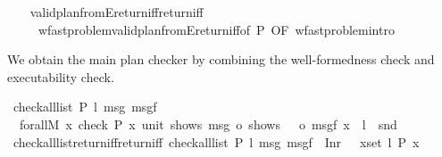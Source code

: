 \begin{isabellebody}
\endisatagproof
{\isafoldproof}%
%
\isadelimproof
\isanewline
%
\endisadelimproof
\isanewline
\ \ \isamarkupfalse%
\ valid{\isacharunderscore}{\kern0pt}plan{\isacharunderscore}{\kern0pt}from{}E{\isacharunderscore}{\kern0pt}return{\isacharunderscore}{\kern0pt}iff{\isacharprime}{\kern0pt}{\isacharbrackleft}{\kern0pt}return{\isacharunderscore}{\kern0pt}iff{\isacharbrackright}{\kern0pt}\isanewline
\ \ \ \ {\isacharequal}{\kern0pt}\ wf{\isacharunderscore}{\kern0pt}ast{\isacharunderscore}{\kern0pt}problem{\isachardot}{\kern0pt}valid{\isacharunderscore}{\kern0pt}plan{\isacharunderscore}{\kern0pt}from{}E{\isacharunderscore}{\kern0pt}return{\isacharunderscore}{\kern0pt}iff{\isacharbrackleft}{\kern0pt}of\ P{\isacharcomma}{\kern0pt}\ OF\ wf{\isacharunderscore}{\kern0pt}ast{\isacharunderscore}{\kern0pt}problem{\isachardot}{\kern0pt}intro{\isacharbrackright}{\kern0pt}\isanewline
\isanewline
\ \ \isanewline
\isanewline
\ \ \isanewline
\ \ \isanewline
\isanewline
{}\isamarkupfalse%
\ %
%
\isadelimdocument
%
\endisadelimdocument
%
\isatagdocument
%
\isamarkuptrue%
%
\endisatagdocument
{\isafolddocument}%
%
\isadelimdocument
%
\endisadelimdocument
%
\begin{isamarkuptext}%
We obtain the main plan checker by combining the well-formedness check
  and executability check.%
\end{isamarkuptext}\isamarkuptrue%
\isamarkupfalse%
\ {\isachardoublequoteopen}check{\isacharunderscore}{\kern0pt}all{\isacharunderscore}{\kern0pt}list\ P\ l\ msg\ msgf\ {\isasymequiv}\isanewline
\ \ forallM\ {\isacharparenleft}{\kern0pt}{\isasymlambda}x{\isachardot}{\kern0pt}\ check\ {\isacharparenleft}{\kern0pt}P\ x{\isacharparenright}{\kern0pt}\ {\isacharparenleft}{\kern0pt}{\isasymlambda}{\isacharunderscore}{\kern0pt}{\isacharcolon}{\kern0pt}{\isacharcolon}{\kern0pt}unit{\isachardot}{\kern0pt}\ shows\ msg\ o\ shows\ {\isacharprime}{\kern0pt}{\isacharprime}{\kern0pt}{\isacharcolon}{\kern0pt}\ {\isacharprime}{\kern0pt}{\isacharprime}{\kern0pt}\ o\ msgf\ x{\isacharparenright}{\kern0pt}\ {\isacharparenright}{\kern0pt}\ l\ {\isacharless}{\kern0pt}{\isacharplus}{\kern0pt}{\isacharquery}{\kern0pt}\ snd{\isachardoublequoteclose}\isanewline
\isanewline
{}\isamarkupfalse%
\ check{\isacharunderscore}{\kern0pt}all{\isacharunderscore}{\kern0pt}list{\isacharunderscore}{\kern0pt}return{\isacharunderscore}{\kern0pt}iff{\isacharbrackleft}{\kern0pt}return{\isacharunderscore}{\kern0pt}iff{\isacharbrackright}{\kern0pt}{\isacharcolon}{\kern0pt}\ {\isachardoublequoteopen}check{\isacharunderscore}{\kern0pt}all{\isacharunderscore}{\kern0pt}list\ P\ l\ msg\ msgf\ {\isacharequal}{\kern0pt}\ Inr\ {\isacharparenleft}{\kern0pt}{\isacharparenright}{\kern0pt}\ {\isasymlongleftrightarrow}\ {\isacharparenleft}{\kern0pt}{\isasymforall}x{\isasymin}set\ l{\isachardot}{\kern0pt}\ P\ x{\isacharparenright}{\kern0pt}{\isachardoublequoteclose}\isanewline

\end{isabellebody}
